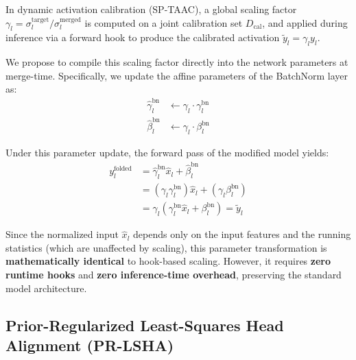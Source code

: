 \documentclass{article}
\theoremstyle{plain}
\theoremstyle{definition}
\theoremstyle{remark}
\begin{document}
In dynamic activation calibration (SP-TAAC), a global scaling factor $\gamma_l = \sigma^{\text{target}}_l / \sigma^{\text{merged}}_l$ is computed on a joint calibration set $D_{\text{cal}}$, and applied during inference via a forward hook to produce the calibrated activation $\tilde{y}_l = \gamma_l y_l$.

We propose to compile this scaling factor directly into the network parameters at merge-time. Specifically, we update the affine parameters of the BatchNorm layer as:
\begin{align}
    \hat{\gamma}^{\text{bn}}_l &\leftarrow \gamma_l \cdot \gamma^{\text{bn}}_l \\
    \hat{\beta}^{\text{bn}}_l &\leftarrow \gamma_l \cdot \beta^{\text{bn}}_l
\end{align}

Under this parameter update, the forward pass of the modified model yields:
\begin{align}
    y^{\text{folded}}_l &= \hat{\gamma}^{\text{bn}}_l \hat{x}_l + \hat{\beta}^{\text{bn}}_l \\
    &= (\gamma_l \gamma^{\text{bn}}_l) \hat{x}_l + (\gamma_l \beta^{\text{bn}}_l) \\
    &= \gamma_l (\gamma^{\text{bn}}_l \hat{x}_l + \beta^{\text{bn}}_l) = \tilde{y}_l
\end{align}

Since the normalized input $\hat{x}_l$ depends only on the input features and the running statistics (which are unaffected by scaling), this parameter transformation is \textbf{mathematically identical} to hook-based scaling. However, it requires \textbf{zero runtime hooks} and \textbf{zero inference-time overhead}, preserving the standard model architecture.

\subsection{Prior-Regularized Least-Squares Head Alignment (PR-LSHA)}
\label{sec:pr-lsha}
\end{document}
